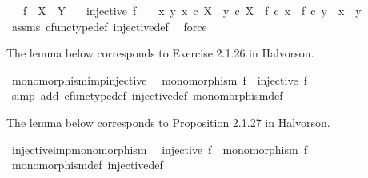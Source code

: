 \begin{isabellebody}
\ \ \ {\isachardoublequoteopen}f\ {\isacharcolon}{\kern0pt}\ X\ {\isasymrightarrow}\ Y{\isachardoublequoteclose}\isanewline
\ \ \ {\isachardoublequoteopen}injective\ f\ \ {\isasymlongleftrightarrow}\ {\isacharparenleft}{\kern0pt}{\isasymforall}\ x\ y{\isachardot}{\kern0pt}\ {\isacharparenleft}{\kern0pt}x\ {\isasymin}\isactrlsub c\ X\ {\isasymand}\ y\ {\isasymin}\isactrlsub c\ X\ {\isasymand}\ f\ {\isasymcirc}\isactrlsub c\ x\ {\isacharequal}{\kern0pt}\ f\ {\isasymcirc}\isactrlsub c\ y{\isacharparenright}{\kern0pt}\ {\isasymlongrightarrow}\ x\ {\isacharequal}{\kern0pt}\ y{\isacharparenright}{\kern0pt}{\isachardoublequoteclose}\isanewline
%
\isadelimproof
\ \ %
\endisadelimproof
%
\isatagproof
{}\isamarkupfalse%
\ assms\ cfunc{\isacharunderscore}{\kern0pt}type{\isacharunderscore}{\kern0pt}def\ injective{\isacharunderscore}{\kern0pt}def\ \isamarkupfalse%
\ force%
\endisatagproof
{\isafoldproof}%
%
\isadelimproof
%
\endisadelimproof
%
\begin{isamarkuptext}%
The lemma below corresponds to Exercise 2.1.26 in Halvorson.%
\end{isamarkuptext}\isamarkuptrue%
\isamarkupfalse%
\ monomorphism{\isacharunderscore}{\kern0pt}imp{\isacharunderscore}{\kern0pt}injective{\isacharcolon}{\kern0pt}\isanewline
\ \ {\isachardoublequoteopen}monomorphism\ f\ {\isasymLongrightarrow}\ injective\ f{\isachardoublequoteclose}\isanewline
%
\isadelimproof
\ \ %
\endisadelimproof
%
\isatagproof
{}\isamarkupfalse%
\ {\isacharparenleft}{\kern0pt}simp\ add{\isacharcolon}{\kern0pt}\ cfunc{\isacharunderscore}{\kern0pt}type{\isacharunderscore}{\kern0pt}def\ injective{\isacharunderscore}{\kern0pt}def\ monomorphism{\isacharunderscore}{\kern0pt}def{\isacharparenright}{\kern0pt}%
\endisatagproof
{\isafoldproof}%
%
\isadelimproof
%
\endisadelimproof
%
\begin{isamarkuptext}%
The lemma below corresponds to Proposition 2.1.27 in Halvorson.%
\end{isamarkuptext}\isamarkuptrue%
\isamarkupfalse%
\ injective{\isacharunderscore}{\kern0pt}imp{\isacharunderscore}{\kern0pt}monomorphism{\isacharcolon}{\kern0pt}\isanewline
\ \ {\isachardoublequoteopen}injective\ f\ {\isasymLongrightarrow}\ monomorphism\ f{\isachardoublequoteclose}\isanewline
%
\isadelimproof
\ \ %
\endisadelimproof
%
\isatagproof
{}\isamarkupfalse%
\ monomorphism{\isacharunderscore}{\kern0pt}def\ injective{\isacharunderscore}{\kern0pt}def\isanewline
{}\isamarkupfalse%

\end{isabellebody}
